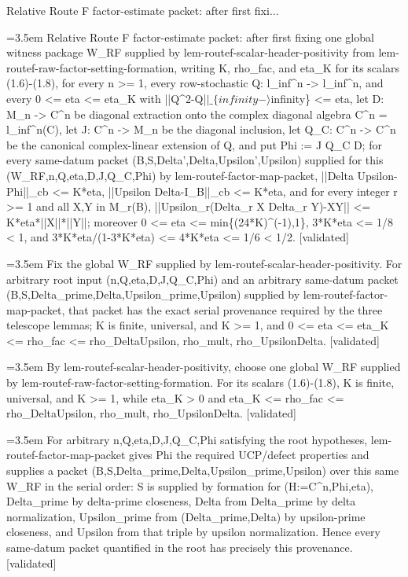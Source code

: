 \documentclass{article}
\newcommand{\step}[1]{\par\noindent\hangindent=3.5em\hangafter=1%
  \makebox[3.5em][l]{\textbf{#1.}}}
\newcommand{\steptag}[1]{\hfill{\small\textsf{[#1]}}}
\begin{document}
\begin{proofbox}{Relative Route F factor-estimate packet: after first fixi...}
\step{1} Relative Route F factor-estimate packet: after first fixing one global witness package W\_RF supplied by lem-routef-scalar-header-positivity from lem-routef-raw-factor-setting-formation, writing K, rho\_fac, and eta\_K for its scalars (1.6)-(1.8), for every n >= 1, every row-stochastic Q: l\_inf\textasciicircum{}n -> l\_inf\textasciicircum{}n, and every 0 <= eta <= eta\_K with ||Q\textasciicircum{}2-Q|$|\_\{infinity-\rangle$infinity\} <= eta, let D: M\_n -> C\textasciicircum{}n be diagonal extraction onto the complex diagonal algebra C\textasciicircum{}n = l\_inf\textasciicircum{}n(C), let J: C\textasciicircum{}n -> M\_n be the diagonal inclusion, let Q\_C: C\textasciicircum{}n -> C\textasciicircum{}n be the canonical complex-linear extension of Q, and put Phi := J Q\_C D; for every same-datum packet (B,S,Delta',Delta,Upsilon',Upsilon) supplied for this (W\_RF,n,Q,eta,D,J,Q\_C,Phi) by lem-routef-factor-map-packet, ||Delta Upsilon-Phi||\_cb <= K*eta, ||Upsilon Delta-I\_B||\_cb <= K*eta, and for every integer r >= 1 and all X,Y in M\_r(B), ||Upsilon\_r(Delta\_r X Delta\_r Y)-XY|| <= K*eta*||X||*||Y||; moreover 0 <= eta <= min\{(24*K)\textasciicircum{}(-1),1\}, 3*K*eta <= 1/8 < 1, and 3*K*eta/(1-3*K*eta) <= 4*K*eta <= 1/6 < 1/2. \steptag{validated} \\[6pt]
\step{1.1} Fix the global W\_RF supplied by lem-routef-scalar-header-positivity. For arbitrary root input (n,Q,eta,D,J,Q\_C,Phi) and an arbitrary same-datum packet (B,S,Delta\_prime,Delta,Upsilon\_prime,Upsilon) supplied by lem-routef-factor-map-packet, that packet has the exact serial provenance required by the three telescope lemmas; K is finite, universal, and K >= 1, and 0 <= eta <= eta\_K <= rho\_fac <= rho\_DeltaUpsilon, rho\_mult, rho\_UpsilonDelta. \steptag{validated} \\[6pt]
\step{1.1.1} By lem-routef-scalar-header-positivity, choose one global W\_RF supplied by lem-routef-raw-factor-setting-formation. For its scalars (1.6)-(1.8), K is finite, universal, and K >= 1, while eta\_K > 0 and eta\_K <= rho\_fac <= rho\_DeltaUpsilon, rho\_mult, rho\_UpsilonDelta. \steptag{validated} \\[4pt]
\step{1.1.2} For arbitrary n,Q,eta,D,J,Q\_C,Phi satisfying the root hypotheses, lem-routef-factor-map-packet gives Phi the required UCP/defect properties and supplies a packet (B,S,Delta\_prime,Delta,Upsilon\_prime,Upsilon) over this same W\_RF in the serial order: S is supplied by formation for (H:=C\textasciicircum{}n,Phi,eta), Delta\_prime by delta-prime closeness, Delta from Delta\_prime by delta normalization, Upsilon\_prime from (Delta\_prime,Delta) by upsilon-prime closeness, and Upsilon from that triple by upsilon normalization. Hence every same-datum packet quantified in the root has precisely this provenance. \steptag{validated} \\[4pt]

\end{proofbox}
\end{document}
